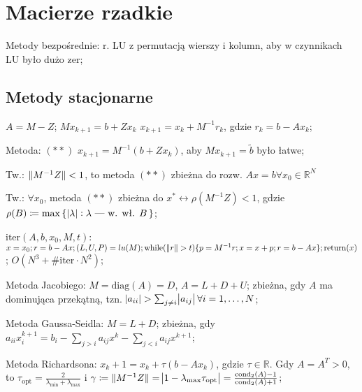\section{Macierze rzadkie}

\entry
Metody bezpośrednie:
r. LU z permutacją wierszy i kolumn, aby w czynnikach LU było dużo zer;


\subsection{Metody stacjonarne}

\entry
$A=M-Z$;
\entry
$Mx_{k+1}=b+Zx_{k}$
\entry
$x_{k+1}=x_k+M^{-1}r_k$, gdzie $r_k=b-Ax_k$;

\entry
Metoda: $\mathrm{(**)}$ $x_{k+1}=M^{-1}(b+Zx_k)$,
aby $Mx_{k+1}=\tilde{b}$ było łatwe;

\entry
Tw.: $\|M^{-1}Z\| < 1$,
to metoda $\mathrm{(**)}$ zbieżna do rozw. $Ax=b \forall x_0 \in \mathbb{R}^N$

\entry
Tw.: $\forall x_0$,
metoda $\mathrm{(**)}$
zbieżna do $x^* \leftrightarrow \rho(M^{-1}Z) < 1$,
gdzie $\rho(B) \coloneqq \max\set{\abs{\lambda} : \lambda\text{ --- w. wł. } B}$;

\entry
$\mathrm{iter}(A,b,x_0,M,t)$:
$x=x_0;
r=b - Ax;
(L,U,P) = lu(M);
\mathrm{while}(\|r\| > t) \{
    p = M^{-1}r;
    x=x+p;
    r=b-Ax
\};
\mathrm{return}(x)
$;
$O(N^3 + \mathrm{\#iter} \cdot N^2)$;

\entry
Metoda Jacobiego:
$M=\mathrm{diag}(A) = D$, $A=L+D+U$;
zbieżna, gdy $A$ ma dominująca przekątną,
tzn. $\abs{a_{ii}} > \sum_{j\neq i}\abs{a_{ij}} \forall i=1, \ldots, N$;

\entry
Metoda Gaussa-Seidla:
$M = L + D$;
zbieżna, gdy $a_{ii}x_i^{k+1}=b_i-\sum_{j>i}a_{ij}x^k-\sum_{j<i}a_{ij}x^{k+1}$;

\entry
Metoda Richardsona:
$x_k+1 = x_k + \tau(b-Ax_k)$, gdzie $\tau\in\mathbb{R}$.
Gdy $A=A^T>0$,
to $\tau_{\mathrm{opt}}=\frac{2}{\lambda_{\mathrm{min}} + \lambda_{\mathrm{max}} }$
i $\gamma \coloneqq \|M^{-1}Z\|=\abs{1-\lambda_{\mathrm{max}}\tau_{\mathrm{opt}}}=\frac{\mathrm{cond}_2(A)-1}{\mathrm{cond}_2(A) + 1}$;

